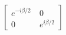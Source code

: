\documentclass[preview]{standalone}
\begin{document}
\begin{align*}
\begin{bmatrix} e^{-i\beta/2}\
        & 0 \\[2mm] 0 & e^{i\beta/2} \end{bmatrix}
\end{align*}
\end{document}
